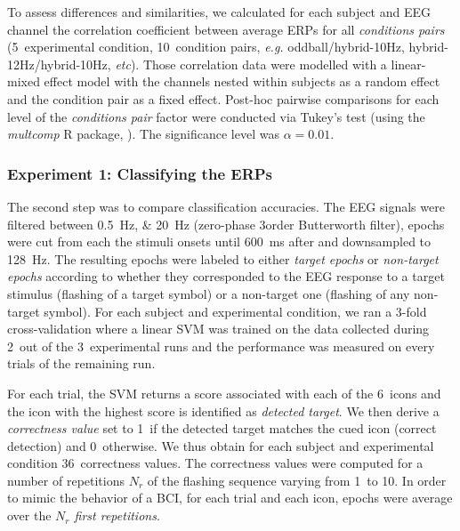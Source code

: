 \documentclass[10pt]{article}
\begin{document}
        To assess differences and similarities, we calculated for each subject and EEG channel the correlation coefficient between average ERPs for all \emph{conditions pairs} (5~experimental condition, 10~condition pairs, \emph{e.g.} oddball/hybrid-10Hz, hybrid-12Hz/hybrid-10Hz, \emph{etc}).
        Those correlation data were modelled with a linear-mixed effect model with the channels nested within subjects as a random effect and the condition pair as a fixed effect.
        Post-hoc pairwise comparisons for each level of the \emph{conditions pair} factor were conducted via Tukey's test (using the \emph{multcomp} R package, \cite{multcomp2008}).
        The significance level was $\alpha = 0.01$.

        \subsubsection{Experiment 1: Classifying the \acsp{ERP}}
        \label{sec:2.3.1AnalysisExp1bis}

        The second step was to compare classification accuracies.
        The \ac{EEG} signals were filtered between \SIlist[list-units = single]{0.5;20}{\Hz} (zero-phase 3\rd order Butterworth filter), epochs were cut from each the stimuli onsets until \SI{600}{\ms} after and downsampled to \SI{128}{\Hz}.
        The resulting epochs were labeled to either \emph{target epochs} or \emph{non-target epochs} according to whether they corresponded to the \ac{EEG} response to a target stimulus (flashing of a target symbol) or a non-target one (flashing of any non-target symbol).
        For each subject and experimental condition, we ran a 3-fold cross-validation where a linear \ac{SVM} was trained \parencite{Keerthi2006} on the data collected during 2~out of the 3~experimental runs and the performance was measured on every trials of the remaining run.

        For each trial, the \ac{SVM} returns a score associated with each of the 6~icons and the icon with the highest score is identified as \emph{detected target}.
        We then derive a \emph{correctness value} set to 1~if the detected target matches the cued icon (correct detection) and 0~otherwise.
        We thus obtain for each subject and experimental condition 36~correctness values.
        The correctness values were computed for a number of repetitions $N_r$ of the flashing sequence varying from 1~to 10.
        In order to mimic the behavior of a \ac{BCI}, for each trial and each icon, epochs were average over the \emph{$N_r$ first repetitions}.
\end{document}
